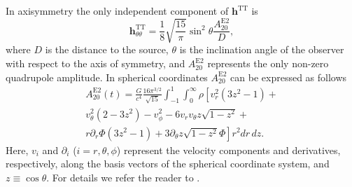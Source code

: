 In axisymmetry the only independent component of $\mathbf{h}^\mathrm{TT}$ is 
\begin{equation}
\mathbf{h}^\mathrm{TT}_{\theta \theta} = \frac{1}{8}\sqrt{\frac{15}{\pi}} \sin^2{\theta} \frac{A_{20}^\mathrm{E2}}{D},
\end{equation}
where $D$ is the distance to the source, $\theta$ is the inclination angle of the observer with respect to the
axis of symmetry, and $A_{20}^\mathrm{E2}$ represents the only non-zero quadrupole amplitude.
In spherical coordinates $A_{20}^\mathrm{E2}$ can be expressed as follows
\begin{eqnarray} \label{eq:2dquad}
A_{20}^\mathrm{E2} (t) =  \frac{G}{c^4} \frac{16 \pi^{3/2}}{\sqrt{15}} \int_{-1}^{1}\int^{\infty}_0 \rho \left [ v_r^2(3 z^2 - 1)+ \right. \nonumber \\
v_{\theta}^2(2-3 z^2) - v_{\phi}^2 - 6 v_r v_{\theta} z\sqrt{1-z^2} + \nonumber \\
r \partial_r \Phi (3 z^2 - 1) +\left. 3 \partial_{\theta}z\sqrt{1-z^2} \Phi \right ]r^2 dr \, dz.
\end{eqnarray}
Here, $v_i$ and $\partial_i$ ($i = r, \theta, \phi$) represent the velocity components and derivatives, respectively, along
the basis vectors of the spherical coordinate system, and $z \equiv \cos \theta$.
For details we refer the reader to \cite{mueller_97}.
